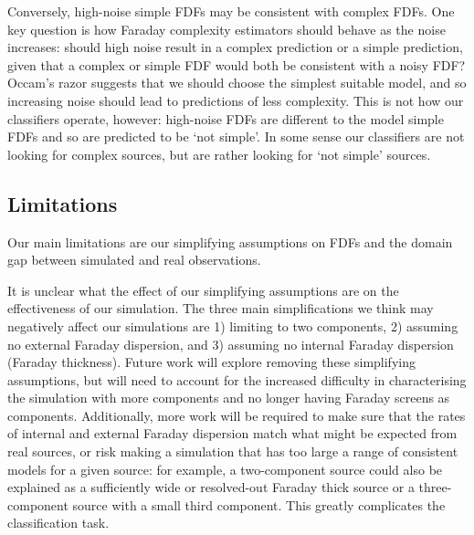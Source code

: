     Conversely, high-noise simple FDFs may be consistent with complex FDFs. One key question is how Faraday complexity estimators should behave as the noise increases: should high noise result in a complex prediction or a simple prediction, given that a complex or simple FDF would both be consistent with a noisy FDF? Occam's razor suggests that we should choose the simplest suitable model, and so increasing noise should lead to predictions of less complexity. This is not how our classifiers operate, however: high-noise FDFs are different to the model simple FDFs and so are predicted to be `not simple'. In some sense our classifiers are not looking for complex sources, but are rather looking for `not simple' sources.

  \subsection{Limitations}
  \label{sec:faraday-limitations}

    Our main limitations are our simplifying assumptions on FDFs and the domain gap between simulated and real observations.

    It is unclear what the effect of our simplifying assumptions are on the effectiveness of our simulation. The three main simplifications we think may negatively affect our simulations are 1) limiting to two components, 2) assuming no external Faraday dispersion, and 3) assuming no internal Faraday dispersion (Faraday thickness). Future work will explore removing these simplifying assumptions, but will need to account for the increased difficulty in characterising the simulation with more components and no longer having Faraday screens as components. Additionally, more work will be required to make sure that the rates of internal and external Faraday dispersion match what might be expected from real sources, or risk making a simulation that has too large a range of consistent models for a given source: for example, a two-component source could also be explained as a sufficiently wide or resolved-out Faraday thick source or a three-component source with a small third component. This greatly complicates the classification task.

